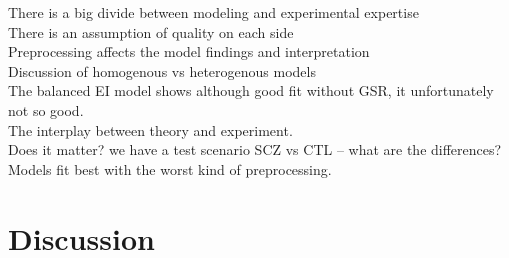 \documentclass[10pt]{article}
\begin{document}
There is a big divide between modeling and experimental expertise \\
There is an assumption of quality on each side \\
Preprocessing affects the model findings and interpretation \\
Discussion of homogenous vs heterogenous models\\
The balanced EI model shows although good fit without GSR, it unfortunately not so good. \\
The interplay between theory and experiment. \\
Does it matter? we have a test scenario SCZ vs CTL -- what are the differences? \\
Models fit best with the worst kind of preprocessing.

\section{Discussion}
\end{document}
